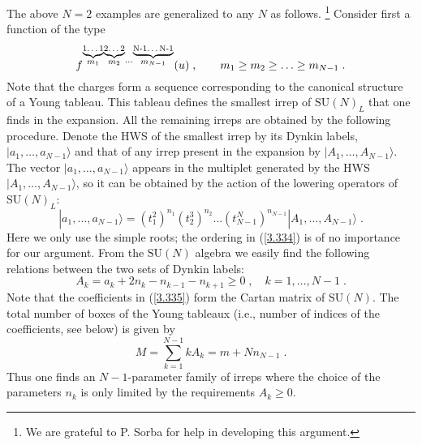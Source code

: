 \documentclass[a4paper,12pt]{article}
\begin{document}
The above $N=2$ examples are generalized to any $N$ as follows. 
\footnote{We are grateful to P. Sorba for help in developing this 
argument.} Consider first a function of the type 
\begin{equation}\label{3.333}
  f^{\stackrel{\underbrace{\mbox{\scriptsize 
1\ldots 1}}}{m_1} \stackrel{\underbrace{\mbox{\scriptsize 2\ldots 
2}}}{m_2}\cdots \stackrel{\underbrace{\mbox{\scriptsize N-1\ldots 
N-1}}}{m_{N-1}}}(u)\;, \qquad { m_1 \geq m_2\geq \ldots \geq 
m_{N-1} } \;. 
\end{equation}
Note that the charges form a sequence corresponding to the 
canonical structure of a Young tableau. This tableau defines the 
smallest irrep of $\mbox{SU}(N)_L$ that one finds in the 
expansion. All the remaining irreps are obtained by the following 
procedure. Denote the HWS of the smallest irrep by its Dynkin 
labels, $|a_1,\ldots,a_{N-1}\rangle$ and that of any irrep present 
in the expansion by $|A_1,\ldots,A_{N-1}\rangle$. The vector 
$|a_1,\ldots,a_{N-1}\rangle$ appears in the multiplet generated by 
the HWS $|A_1,\ldots,A_{N-1}\rangle$, so it can be obtained by the 
action of the lowering operators of $\mbox{SU}(N)_L$: 
\begin{equation}\label{3.334}
  |a_1,\ldots,a_{N-1}\rangle = (t^2_1)^{n_1}(t^3_2)^{n_2}\ldots 
(t^N_{N-1})^{n_{N-1}}|A_1,\ldots,A_{N-1}\rangle \;.
\end{equation}
Here we only use the simple roots; the ordering in (\ref{3.334}) 
is of no importance for our argument. From the $\mbox{SU}(N)$ 
algebra we easily find the following relations between the two 
sets of Dynkin labels:
\begin{equation}\label{3.335}
  A_k = a_k + 2n_k - n_{k-1} - n_{k+1} \geq 0\;, \quad k=1,\ldots, 
N-1\;.
\end{equation}
Note that the coefficients in (\ref{3.335}) form the Cartan matrix 
of $\mbox{SU}(N)$. The total number of boxes of the Young tableaux 
(i.e., number of indices of the coefficients, see below) is given 
by 
\begin{equation}\label{3.335'}
  M = \sum^{N-1}_{k=1}kA_k = m + N n_{N-1}\;.
\end{equation}
Thus one finds an $N-1$-parameter family of irreps where the 
choice of the parameters $n_k$ is only limited by the requirements 
$A_k\geq 0$.  
\end{document}
